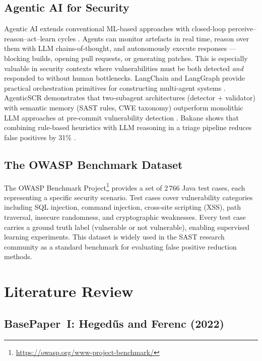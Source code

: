 \documentclass[conference]{IEEEtran}
\begin{document}
\subsection{Agentic AI for Security}

Agentic AI extends conventional ML-based approaches with closed-loop
perceive--reason--act--learn cycles \cite{syed2025agentic}. Agents can monitor
artefacts in real time, reason over them with LLM chains-of-thought, and
autonomously execute responses --- blocking builds, opening pull requests, or
generating patches. This is especially valuable in security contexts where
vulnerabilities must be both detected \emph{and} responded to without human
bottlenecks. LangChain and LangGraph provide practical orchestration primitives
for constructing multi-agent systems \cite{syed2025agentic}. AgenticSCR
demonstrates that two-subagent architectures (detector + validator) with semantic
memory (SAST rules, CWE taxonomy) outperform monolithic LLM approaches at
pre-commit vulnerability detection \cite{charoenwet2026agenticscr}. Bakane shows
that combining rule-based heuristics with LLM reasoning in a triage pipeline
reduces false positives by 31\% \cite{bakane2025thesis}.

\subsection{The OWASP Benchmark Dataset}

The OWASP Benchmark Project\footnote{\url{https://owasp.org/www-project-benchmark/}}
provides a set of 2\,766 Java test cases, each representing a specific security
scenario. Test cases cover vulnerability categories including SQL injection,
command injection, cross-site scripting (XSS), path traversal, insecure
randomness, and cryptographic weaknesses. Every test case carries a ground truth
label (vulnerable or not vulnerable), enabling supervised learning experiments.
This dataset is widely used in the SAST research community as a standard benchmark
for evaluating false positive reduction methods.

\section{Literature Review}
\label{sec:literature}

\subsection{BasePaper~I: Heged\H{u}s and Ferenc (2022)}
\label{sec:bp1}
\end{document}
